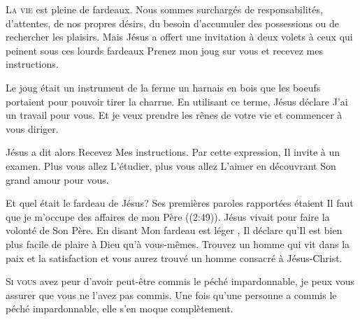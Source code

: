 \lettrine{L}{a vie} est pleine de fardeaux.
 Nous sommes surchargés de responsabilités, d'attentes,
 de nos propres désirs, du besoin d'accumuler des possessions
 ou de rechercher les plaisirs.
 Mais Jésus a offert une invitation à deux volets à ceux
 qui peinent sous ces lourds fardeaux\frcolon{}
 \Og Prenez mon joug sur vous et recevez mes instructions. \Fg{}

Le joug était un instrument de la ferme \ocadr un harnais en bois
 que les boeufs portaient pour pouvoir tirer la charrue.
 En utilisant ce terme, Jésus déclare\frcolon{} 
 \Og J'ai un travail pour vous. Et je veux prendre les rênes
 de votre vie et commencer à vous diriger. \Fg{}


Jésus a dit alors\frcolon{}  \Og Recevez Mes instructions. \Fg{}
 Par cette expression, Il invite à un examen. Plus vous allez L'étudier,
 plus vous allez L'aimer en découvrant Son grand amour pour vous. 

Et quel était le fardeau de Jésus? Ses premières paroles rapportées
 étaient\frcolon{}  \Og Il faut que je m'occupe
 des affaires de mon Père \Fg{} ((2:49)).
 Jésus vivait pour faire la volonté de Son Père. En disant\frcolon{} 
 \Og Mon fardeau est léger \Fg{}, Il déclare qu'Il est bien plus facile
 de plaire à Dieu qu'à vous-mêmes.
 Trouvez un homme qui vit dans la paix et la satisfaction
 et vous aurez trouvé un homme consacré à Jésus-Christ. 

\dvrule






\lettrine{S}{i vous} avez peur d'avoir peut-être commis
 le péché impardonnable, je peux vous assurer que vous ne l'avez pas commis.
 Une fois qu'une personne a commis le péché impardonnable,
 elle s'en moque complètement. 

